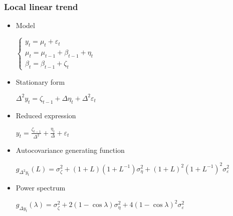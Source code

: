 \documentclass[12pt]{article}
\theoremstyle{definition}
\theoremstyle{remark}
\numberwithin{equation}{section}
\begin{document}
\subsubsection{Local linear trend}
\begin{itemize}
	\item Model

	$\begin{cases}
		y_t = \mu_t+\varepsilon_t\\
		\mu_t =  \mu_{t-1}+\beta_{t-1}+\eta_t\\
		\beta_t = \beta_{t-1}+\zeta_t
	\end{cases}$

	\item Stationary form

	$\Delta^2 y_t = \zeta_{t-1} + \Delta\eta_t + \Delta^2\varepsilon_t$

	\item Reduced expression

	$\displaystyle y_t = \frac {\zeta_{t-1}} {\Delta^2} + \frac {\eta_t} \Delta + \varepsilon_t$

	\item Autocovariance generating function

	$g_{\Delta^2 y_t}(L) = \sigma^2_{\zeta}+(1+L)(1+L^{-1})\sigma^2_{\eta} + (1+L)^2(1+L^{-1})^2\sigma^2_{\varepsilon}$

	\item Power spectrum

	$g_{\Delta y_t}(\lambda) = \sigma^2_{\zeta} + 2(1-\cos \lambda)\sigma^2_{\eta}+4(1-\cos\lambda)^2\sigma^2_\varepsilon$

\end{itemize}
\end{document}
